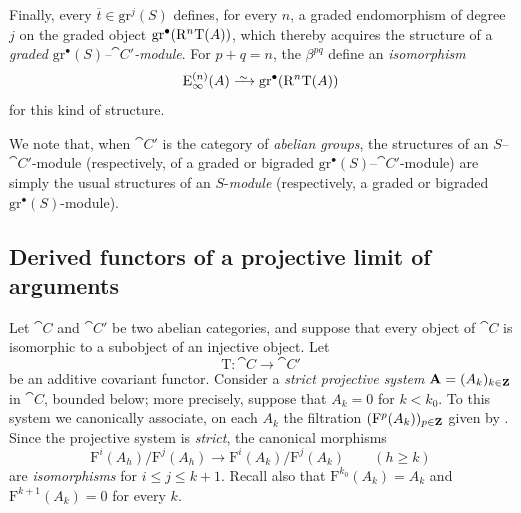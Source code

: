 \begin{env}[13.6.6]
Finally, every $\overline{t}\in\mathrm{gr}^j(S)$ defines, for every
$n$, a graded endomorphism of degree $j$ on the graded object
$\mathrm{gr}^\bullet(\mathrm{R}^n\mathrm{T}(A))$, which thereby acquires the
structure of a \emph{graded
$\mathrm{gr}^\bullet(S)$--$\cat{C}'$-module}.
For $p+q=n$, the $\beta^{pq}$ define an \emph{isomorphism}
\[
  \mathrm{E}_\infty^{(n)}(A)
  \isoto
  \mathrm{gr}^\bullet(\RR^n\mathrm{T}(A))
\]
for this kind of structure.

We note that, when $\cat{C}'$ is the category of \emph{abelian groups}, the
structures of an $S$--$\cat{C}'$-module (respectively, of a graded or
bigraded $\mathrm{gr}^\bullet(S)$--$\cat{C}'$-module) are simply the
usual structures of an $S$-\emph{module} (respectively, a graded or
bigraded $\mathrm{gr}^\bullet(S)$-module).
\end{env}

\subsection{Derived functors of a projective limit of arguments}
\label{subsection:0.13.7}
\label{0.13.7}

\begin{env}[13.7.1]
\label{0.13.7.1}
Let $\cat{C}$ and $\cat{C}'$ be two abelian categories, and suppose
that every object of $\cat{C}$ is isomorphic to a subobject of an
injective object.
Let
\[
  \mathrm{T}:\cat{C}\longrightarrow\cat{C}'
\]
be an additive covariant functor.
Consider a \emph{strict projective system}
$\mathbf{A}=(A_k)_{k\in\mathbf{Z}}$ in $\cat{C}$, bounded below; more
precisely, suppose that $A_k=0$ for $k<k_0$.
To this system we canonically associate, on each $A_k$ the
filtration $(\mathrm{F}^p(A_k))_{p\in\mathbf{Z}}$ given by
.
Since the projective system is \emph{strict}, the canonical morphisms
\begin{equation}
\label{0.13.7.1.1}
\tag{13.7.1.1}
  \mathrm{F}^i(A_h)/\mathrm{F}^j(A_h)
  \longrightarrow
  \mathrm{F}^i(A_k)/\mathrm{F}^j(A_k)
  \qquad(h\geq k)
\end{equation}
are \emph{isomorphisms} for $i\leq j\leq k+1$.
Recall also that
$\mathrm{F}^{k_0}(A_k)=A_k$ and
$\mathrm{F}^{k+1}(A_k)=0$ for every $k$.
\end{env}

